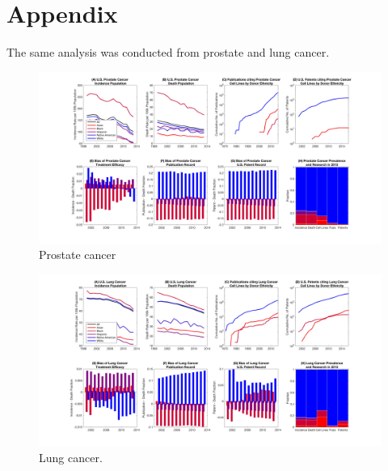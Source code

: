 \documentclass[10pt]{article}
\begin{document}



\section{Appendix}
The same analysis was conducted from prostate and lung cancer. 

\begin{figure}[h!]
\centering
\includegraphics[width=1\columnwidth, trim = {30cm 10cm 30cm 5cm}, clip]{Figures/ProstateComposite.jpg}
\caption{\label{PS2} Prostate cancer}
\end{figure}

\begin{figure}[h!]
\centering
\includegraphics[width=1\columnwidth, trim = {30cm 10cm 30cm 5cm}, clip]{Figures/LungComposite.jpg}
\caption{\label{PS3} Lung cancer.}
\end{figure}
\end{document}
